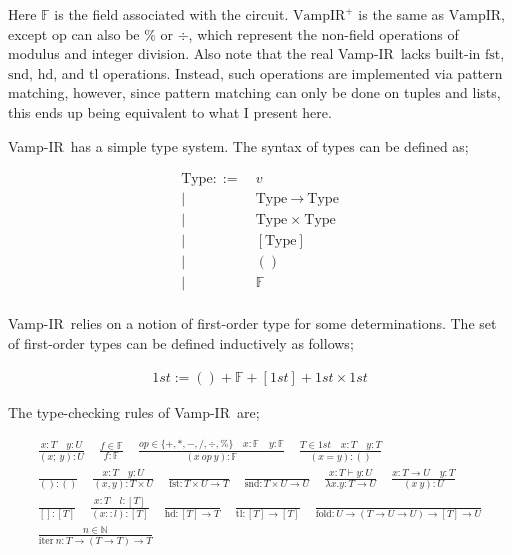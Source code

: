 \documentclass{msc}
\newcommand{\vampir}{Vamp-IR}
\begin{document}
Here $\mathbb{F}$ is the field associated with the circuit. $\text{VampIR}^+$ is the same as $\text{VampIR}$, except $\text{op}$ can also be $\%$ or $\div$, which represent the non-field operations of modulus and integer division. Also note that the real \vampir\ lacks built-in $\text{fst}$, $\text{snd}$, $\text{hd}$, and $\text{tl}$ operations. Instead, such operations are implemented via pattern matching, however, since pattern matching can only be done on tuples and lists, this ends up being equivalent to what I present here.

\vampir\ has a simple type system. The syntax of types can be defined as;

\begin{align*}
    \text{Type} ::=&\ v \\
    |\ &\ \text{Type} \ \xrightarrow{} \ \text{Type} \\
    |\ &\ \text{Type} \ \times \ \text{Type} \\
    |\ &\ [\text{Type}] \\
    |\ &\ () \\
    |\ &\ \mathbb{F} \\
\end{align*}

\vampir\ relies on a notion of first-order type for some determinations. The set of first-order types can be defined inductively as follows;

\begin{align*}
    1st := () + \mathbb{F} + [1st] + 1st \times 1st
\end{align*}

The type-checking rules of \vampir\ are;

\begin{align*}
    \frac{x : T \quad y : U}{(x;\ y) : U} \quad
    \frac{f \in \mathbb{F}}{f : \mathbb{F}} \quad
    \frac{op \in \{+, *, -, /, \div, \% \} \quad x : \mathbb{F} \quad y : \mathbb{F} }{(x\ op\ y) : \mathbb{F}} \quad
    \frac{T \in 1st \quad x : T \quad y : T}{(x = y) : ()} \\
    \frac{}{() : ()} \quad
    \frac{x : T \quad y : U}{(x,y) : T \times U} \quad
    \frac{}{\text{fst} : T \times U \rightarrow T} \quad
    \frac{}{\text{snd} : T \times U \rightarrow U}\quad
    \frac{x : T \vdash y : U}{\lambda x.y : T \rightarrow U} \quad
    \frac{x : T \rightarrow U \quad y : T}{(x\ y) : U} \\
    \frac{}{[] : [T]} \quad
    \frac{x : T \quad l : [T]}{(x :: l) : [T]} \quad
    \frac{}{\text{hd} : [T] \rightarrow T} \quad
    \frac{}{\text{tl} : [T] \rightarrow [T]} \quad
    \frac{}{\text{fold} : U \rightarrow (T \rightarrow U \rightarrow U) \rightarrow [T] \rightarrow U} \\
    \frac{n \in \mathbb{N}}{\text{iter}\ n : T \rightarrow (T \rightarrow T) \rightarrow T}
\end{align*}
\end{document}
